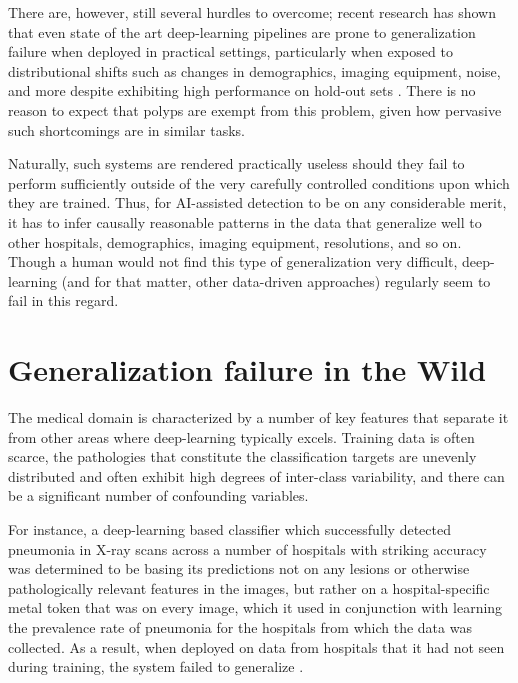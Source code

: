 	
	There are, however, still several hurdles to overcome; recent research has shown that even state of the art deep-learning pipelines are prone to generalization failure when deployed in practical settings, particularly when exposed to distributional shifts such as changes in demographics, imaging equipment, noise, and more despite exhibiting high performance on hold-out sets \cite{retinopathy, damour2020underspecification}. There is no reason to expect that polyps are exempt from this problem, given how pervasive such shortcomings are in similar tasks.
	
	Naturally, such systems are rendered practically useless should they fail to perform sufficiently outside of the very carefully controlled conditions upon which they are trained. Thus, for AI-assisted detection to be on any considerable merit, it has to infer causally reasonable patterns in the data that generalize well to other hospitals, demographics, imaging equipment, resolutions, and so on. Though a human would not find this type of generalization very difficult, deep-learning (and for that matter, other data-driven approaches) regularly seem to fail in this regard. 

\section{Generalization failure in the Wild}

	The medical domain is characterized by a number of key features that separate it from other areas where deep-learning typically excels. Training data is often scarce, the pathologies that constitute the classification targets are unevenly distributed and often exhibit high degrees of inter-class variability, and there can be a significant number of confounding variables. 
		
	For instance, a deep-learning based classifier which successfully detected pneumonia in X-ray scans across a number of hospitals with striking accuracy was determined to be basing its predictions not on any lesions or otherwise pathologically relevant features in the images, but rather on a hospital-specific metal token that was on every image, which it used in conjunction with learning the prevalence rate of pneumonia for the hospitals from which the data was collected. As a result, when deployed on data from hospitals that it had not seen during training, the system failed to generalize \cite{pneumonia}. 
		
